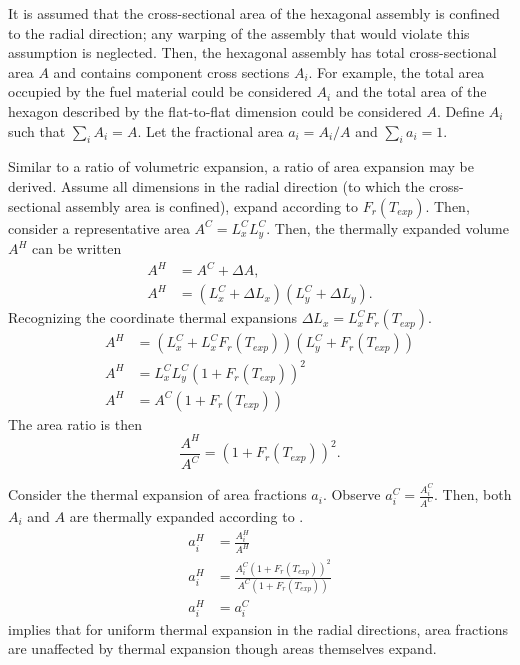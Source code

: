   It is assumed that the cross-sectional area of the hexagonal assembly is 
  confined to the radial direction; any warping of the assembly that would
  violate this assumption is neglected. Then, the hexagonal assembly has total
  cross-sectional area $A$ and contains component cross sections $A_i$. For
  example, the total area occupied by the fuel material could be considered
  $A_i$ and the total area of the hexagon described by the flat-to-flat
  dimension could be considered $A$. Define $A_i$ such that $\sum_{i} A_i = A$.
  Let the fractional area $a_i = A_i/A$ and $\sum_{i} a_i = 1$.

  Similar to a ratio of volumetric expansion, a ratio of area expansion may be
  derived. Assume all dimensions in the radial direction (to which the
  cross-sectional assembly area is confined), expand according to
  $F_r(T_{exp})$. Then, consider a representative area $A^C = L_x^C L_y^C$.
  Then, the thermally expanded volume $A^H$ can be written
  \begin{align}
    A^H &= A^C + \Delta A, \\
    A^H &= (L_x^C + \Delta L_x) (L_y^C + \Delta L_y).
  \end{align}
  Recognizing the coordinate thermal expansions ${\Delta L_x = L_x^C
  F_r(T_{exp})}$.
  \begin{align}
    A^H &= (L_x^C + L_x^C F_r(T_{exp})) (L_y^C + F_r(T_{exp})) \\
    A^H &= L_x^C L_y^C (1 + F_r(T_{exp}))^2 \\
    A^H &= A^C (1 + F_r(T_{exp}))
  \end{align}
  The area ratio is then
  \begin{equation}
    \label{eq:area_ratio}
    \frac{A^H}{A^C} = (1 + F_r(T_{exp}))^2.
  \end{equation}

  Consider the thermal expansion of area fractions $a_i$. Observe $a_i^C =
  \frac{A_i^C}{A^C}$. Then, both $A_i$ and $A$ are thermally expanded according
  to .
  \begin{align}
    a_i^H &= \frac{A_i^H}{A^H} \\
    a_i^H &= \frac{A_i^C (1 + F_r(T_{exp}))^2}{A^C (1 + F_r(T_{exp}))} \\
    \label{eq:constant_area_frac}
    a_i^H &= a_i^C
  \end{align}
   implies that for uniform thermal expansion in the
  radial directions, area fractions are unaffected by thermal expansion though
  areas themselves expand. 
  
